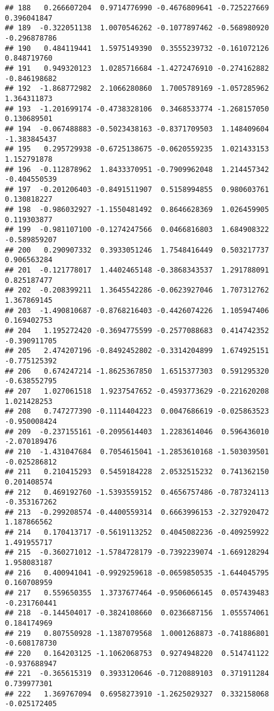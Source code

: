 \documentclass[
]{article}
\begin{document}
\begin{verbatim}
## 188   0.266607204  0.9714776990 -0.4676809641 -0.725227669  0.396041847
## 189  -0.322051138  1.0070546262 -0.1077897462 -0.568980920 -0.296878786
## 190   0.484119441  1.5975149390  0.3555239732 -0.161072126  0.848719760
## 191   0.949320123  1.0285716684 -1.4272476910 -0.274162882 -0.846198682
## 192  -1.868772982  2.1066280860  1.7005789169 -1.057285962  1.364311873
## 193  -1.201699174 -0.4738328106  0.3468533774 -1.268157050  0.130689501
## 194  -0.067488883 -0.5023438163 -0.8371709503  1.148409604 -1.383845437
## 195   0.295729938 -0.6725138675 -0.0620559235  1.021433153  1.152791878
## 196  -0.112878962  1.8433370951 -0.7909962048  1.214457342 -0.404550539
## 197  -0.201206403 -0.8491511907  0.5158994855  0.980603761  0.130818227
## 198  -0.986032927 -1.1550481492  0.8646628369  1.026459905  0.119303877
## 199  -0.981107100 -0.1274247566  0.0466816803  1.684908322 -0.589859207
## 200   0.290907332  0.3933051246  1.7548416449  0.503217737  0.906563284
## 201  -0.121778017  1.4402465148 -0.3868343537  1.291788091  0.825187477
## 202  -0.208399211  1.3645542286 -0.0623927046  1.707312762  1.367869145
## 203  -1.490810687 -0.8768216403 -0.4426074226  1.105947406  0.169402753
## 204   1.195272420 -0.3694775599 -0.2577088683  0.414742352 -0.390911705
## 205   2.474207196 -0.8492452802 -0.3314204899  1.674925151 -0.775125392
## 206   0.674247214 -1.8625367850  1.6515377303  0.591295320 -0.638552795
## 207   1.027061518  1.9237547652 -0.4593773629 -0.221620208  1.021428253
## 208   0.747277390 -0.1114404223  0.0047686619 -0.025863523 -0.950008424
## 209  -0.237155161 -0.2095614403  1.2283614046  0.596436010 -2.070189476
## 210  -1.431047684  0.7054615041 -1.2853610168 -1.503039501 -0.025286812
## 211   0.210415293  0.5459184228  2.0532515232  0.741362150  0.201408574
## 212   0.469192760 -1.5393559152  0.4656757486 -0.787324113 -0.353167262
## 213  -0.299208574 -0.4400559314  0.6663996153 -2.327920472  1.187866562
## 214   0.170413717 -0.5619113252  0.4045082236 -0.409259922  1.491955717
## 215  -0.360271012 -1.5784728179 -0.7392239074 -1.669128294  1.958083187
## 216   0.400941041 -0.9929259618 -0.0659850535 -1.644045795  0.160708959
## 217   0.559650355  1.3737677464 -0.9506066145  0.057439483 -0.231760441
## 218  -0.144504017 -0.3824108660  0.0236687156  1.055574061  0.184174969
## 219   0.807550928 -1.1387079568  1.0001268873 -0.741886801 -0.608178730
## 220   0.164203125 -1.1062068753  0.9274948220  0.514741122 -0.937688947
## 221  -0.365615319  0.3933120646 -0.7120889103  0.371911284  0.739977301
## 222   1.369767094  0.6958273910 -1.2625029327  0.332158068 -0.025172405

\end{verbatim}
\end{document}
